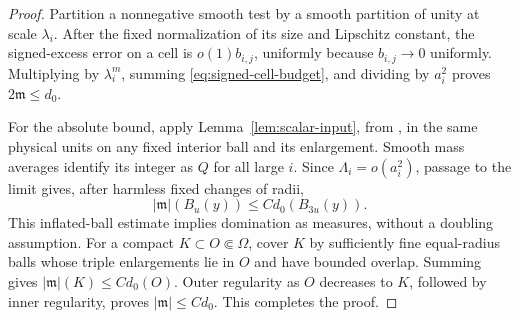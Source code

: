\begin{proof}
Partition a nonnegative smooth test by a smooth partition of unity at
scale $\lambda_i$. After the fixed normalization of its size and
Lipschitz constant, the signed-excess error on a cell is
$o(1)b_{i,j}$, uniformly because $b_{i,j}\to0$ uniformly. Multiplying
by $\lambda_i^m$, summing \eqref{eq:signed-cell-budget}, and dividing
by $a_i^2$ proves $2\mathfrak m\le d_0$.

For the absolute bound, apply Lemma~\ref{lem:scalar-input}, from
\cite[Lemma~2.5]{AE}, in the same physical units on any fixed interior
ball and its enlargement. Smooth mass averages identify its integer as
$Q$ for all large $i$. Since $\Lambda_i=o(a_i^2)$, passage to the
limit gives, after harmless fixed changes of radii,
\[
       |\mathfrak m|(B_u(y))\le C d_0(B_{3u}(y)).
\]
This inflated-ball estimate implies domination as measures, without a
doubling assumption. For a compact $K\subset O\Subset\Omega$, cover
$K$ by sufficiently fine equal-radius balls whose triple enlargements
lie in $O$ and have bounded overlap. Summing gives
$|\mathfrak m|(K)\le C d_0(O)$. Outer regularity as $O$ decreases to
$K$, followed by inner regularity, proves $|\mathfrak m|\le C d_0$.
This completes the proof.
\end{proof}

